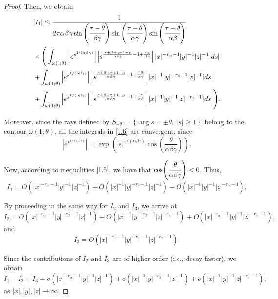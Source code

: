 \documentclass[12pt, reqno]{amsart}
\theoremstyle{definition}
\theoremstyle{remark}
\numberwithin{equation}{section}
\begin{document}
\begin{proof}
Then, we obtain
\begin{equation}\label{1.6}
\begin{aligned}
&|I_1|
\le
\frac{
1
}
{
2\pi\alpha\beta\gamma
\sin\left(\cfrac{\tau-\theta}{\beta\gamma}\right)\sin\left(\cfrac{\tau-\theta}{\alpha\gamma}\right)\sin\left(\cfrac{\tau-\theta}{\alpha\beta}\right)
}
\\&\times\Bigg(\int_{\omega(1;\theta)}
\left|
e^{s^{1/(\alpha\beta\gamma)}}
\right|
\left|
s^{
\frac{\alpha+\beta+\gamma+1-\mu}{\alpha\beta\gamma}
-1
+\frac{r_{\alpha}}{\beta\gamma}
}
\right||x|^{-r_{\alpha}-1}|y|^{-1}|z|^{-1}
|ds|\\
&+\int_{\omega(1;\theta)}
\left|
e^{s^{1/(\alpha\beta\gamma)}}
\right|
\left|
s^{
\frac{\alpha+\beta+\gamma+1-\mu}{\alpha\beta\gamma}
-1
+\frac{r_{\beta}}{\alpha\gamma}
}
\right||x|^{-1}|y|^{-r_{\beta}-1}|z|^{-1}
|ds|\\
&+\int_{\omega(1;\theta)}
\left|
e^{s^{1/(\alpha\beta\gamma)}}
\right|
\left|
s^{
\frac{\alpha+\beta+\gamma+1-\mu}{\alpha\beta\gamma}
-1
+\frac{r_{\gamma}}{\alpha\beta}
}
\right||x|^{-1}|y|^{-1}|z|^{-r_{\gamma}-1}
|ds|\Bigg).
\end{aligned}\end{equation}


Moreover, since the rays defined by
$
S_{\pm\theta}
=
\left\{
\arg s = \pm \theta,\; |s| \ge 1
\right\}
$
belong to the contour $\omega(1;\theta)$, all the integrals in \eqref{1.6} are convergent; since
\[
\left|e^{s^{1/(\alpha\beta\gamma)}}\right|
=
\exp\!\left(
|s|^{1/(\alpha\beta\gamma)}
\cos\!\left(\frac{\theta}{\alpha\beta\gamma}\right)
\right).
\]

Now, according to inequalities \eqref{1.5}, we have that $\cos\!\left(\cfrac{\theta}{\alpha\beta\gamma}\right)<0$. Thus,
$$I_1=O\left(|x|^{-r_{\alpha}-1}|y|^{-1}|z|^{-1}\right)+O\left(|x|^{-1}|y|^{-r_{\beta}-1}|z|^{-1}\right)+O\left(|x|^{-1}|y|^{-1}|z|^{-r_{\gamma}-1}\right).$$

By proceeding in the same way for $I_2$ and $I_3$, we arrive at
\[
I_2=O\left(|x|^{-r_{\alpha}-1}|y|^{-r_{\beta}-1}|z|^{-1}\right)+O\left(|x|^{-1}|y|^{-r_{\beta}-1}|z|^{-r_{\gamma}-1}\right)+O\left(|x|^{-r_{\alpha}-1}|y|^{-1}|z|^{-r_{\gamma}-1}\right),
\]
and
\[
I_3=O\left(|x|^{-r_{\alpha}-1}|y|^{-r_{\beta}-1}|z|^{-r_{\gamma}-1}\right).
\]

Since the contributions of \(I_2\) and \(I_3\) are of higher order (i.e., decay faster), we obtain
$$
I_1-I_2+I_3
=
o\!\left(|x|^{-r_{\alpha}-1}|y|^{-1}|z|^{-1}\right)
+
o\!\left(|x|^{-1}|y|^{-r_{\beta}-1}|z|^{-1}\right)
+
o\!\left(|x|^{-1}|y|^{-1}|z|^{-r_{\gamma}-1}\right),
$$
as $|x|,|y|,|z|\to\infty$.


\end{proof}
\end{document}
